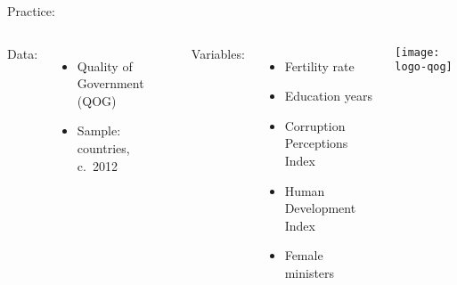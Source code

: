 \documentclass[t]{beamer}
\begin{document}
	\begin{frame}[t]{Practice: }

		\begin{columns}[c]

	    Data:\\[.5em]

			\begin{itemize}
				\item Quality of Government (QOG)
				\item Sample: countries, c.~2012
			\end{itemize}
		
			\vspace{.75em}
		
	    Variables:\\[.5em]
		
			\begin{itemize}
				\item Fertility rate
				\item Education years
				\item Corruption Perceptions Index
				\item Human Development Index
				\item Female ministers
			\end{itemize}
	

			\texttt{[image: logo-qog]}

		\end{columns}
	
	\end{frame}
	
		
\end{document}
